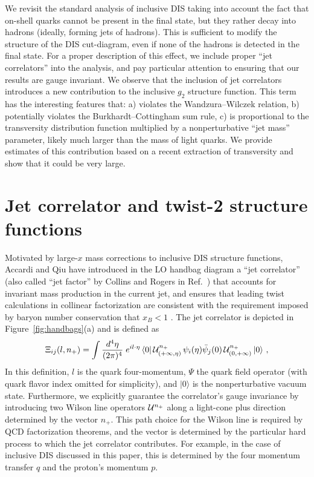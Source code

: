 \documentclass[preprintnumbers,floatfix,nofootinbib]{revtex4}
\newcommand{\de}{d}                    %
\begin{document}
We revisit the standard analysis of inclusive DIS taking into account the fact
that on-shell quarks cannot be present in the final state, but they rather
decay into hadrons (ideally, forming jets of hadrons). This is sufficient to modify the structure of the DIS
cut-diagram, even if none of the hadrons is detected in the final
state. For a proper description of this effect, we include proper ``jet
correlators'' into the analysis, and pay particular attention to ensuring that our results are gauge invariant. We observe that the inclusion of jet correlators introduces a new
contribution to the inclusive $g_2$ structure function. This term has the
interesting features that: a) violates the Wandzura--Wilczek relation, b)
potentially violates the Burkhardt--Cottingham sum rule, c) is
proportional to the transversity distribution function multiplied by a
nonperturbative ``jet mass'' parameter, likely much larger than the mass of light quarks. We provide estimates of this contribution based on a recent extraction of transversity and show that it could be very large.   
 

\section{Jet correlator and twist-2 structure functions}

Motivated by large-$x$ mass corrections to inclusive DIS structure functions,
Accardi and Qiu have introduced in the LO handbag diagram 
a ``jet correlator'' (also called ``jet factor'' by Collins and Rogers in Ref.~\cite{Collins:2007ph})
that accounts for invariant mass production in the current jet, and ensures
that leading twist calculations in collinear factorization are consistent with
the requirement imposed by baryon number conservation that $x_B<1$
\cite{Accardi:2008ne}. The jet correlator is depicted in
Figure~\ref{fig:handbags}(a) and is defined as 
\begin{align} 
\Xi_{ij}(l,n_+) =\int
  \frac{\de^4\eta}{(2\pi)^4}\; e^{i l \cdot \eta}\,
    \langle 0|\, {\cal U}^{n_+}_{(+\infty,\eta)}
\,\psi_i(\eta)
             \bar{\psi}_j(0)\,
{\cal U}^{n_+}_{(0,+\infty)}\,   |0 \rangle \ ,
\label{e:xifull}
\end{align} 
In this definition, $l$ is the quark four-momentum, $\Psi$ the quark field
operator (with quark flavor index omitted for simplicity), and $|0\rangle$ is
the nonperturbative vacuum state. Furthermore, we explicitly guarantee the
correlator's gauge invariance by introducing two Wilson line operators ${\cal
  U}^{n_+}$ along a light-cone plus direction determined by the vector
$n_+$. This path choice for the Wilson line is required by QCD factorization
theorems, and the vector is determined by the particular hard process to which
the jet correlator contributes. For example, in the case of inclusive DIS
discussed in this paper, this is determined by the four momentum transfer $q$
and the proton's momentum $p$. 
\end{document}
